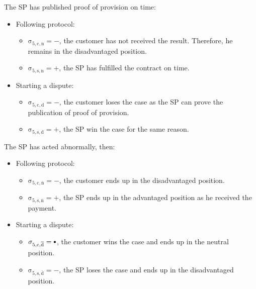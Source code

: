 \documentclass{ieeeaccess}
\newcommand\neutral[1][.75]{\mathbin{\ThisStyle{\vcenter{\hbox{%
  \scalebox{#1}{$\SavedStyle\bullet$}}}}}%
}
\begin{document}
The SP has published proof of provision on time:

\begin{itemize}
\item
  Following protocol:

  \begin{itemize}
  
  \item
    \(\operatorname{\sigma_{5, c, n} = -}\), the customer has not received the result. Therefore, he remains in the disadvantaged position. 
  \item
    \(\operatorname{\sigma_{5, s, n} = +}\), the SP has fulfilled the contract on time.
  \end{itemize}
\item
  Starting a dispute:

  \begin{itemize}
  
  \item
    \(\operatorname{\sigma_{5, c, d} = -}\), the customer loses the case as the SP can prove the publication of proof of provision. 
  \item
    \(\operatorname{\sigma_{5, s, d} = +}\), the SP win the case for the same reason.
  \end{itemize}
\end{itemize}

The SP has acted abnormally, then:

\begin{itemize}
\item
  Following protocol:

  \begin{itemize}
  
  \item
    \(\operatorname{\sigma_{5, c, \overline{n}} = -}\), the customer ends up in the disadvantaged position.
  \item
    \(\operatorname{\sigma_{5, s, \overline{n}} = +}\), the SP ends up in the advantaged position as he received the payment.
  \end{itemize}
\item
  Starting a dispute:

  \begin{itemize}
  
  \item
    \(\operatorname{\sigma_{5, c, \overline{d}} = \neutral}\), the customer wins the case and ends up in the neutral position. 
  \item
    \(\operatorname{\sigma_{5, s, \overline{d}} = -}\), the SP loses the case and ends up in the disadvantaged position. 
  \end{itemize}
\end{itemize}
\end{document}
